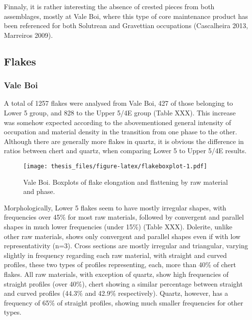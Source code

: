 \documentclass[12pt,twoside]{reedthesis}
\begin{document}
Finnaly, it is rather interesting the absence of crested pieces from both assemblages, mostly at Vale Boi, where this type of core maintenance product has been referenced for both Solutrean and Gravettian occupations (Cascalheira 2013, Marreiros 2009).
\begin{table}

\caption{\label{tab:corepreptypeVB}Core maintenance products by raw material for Upper 5/4E.}
\centering
{}
\end{table}
\hypertarget{flakes}{%
\subsection{Flakes}\label{flakes}}

\hypertarget{vale-boi-5}{%
\subsubsection{Vale Boi}\label{vale-boi-5}}

A total of 1257 flakes were analysed from Vale Boi, 427 of those belonging to Lower 5 group, and 828 to the Upper 5/4E group (Table XXX). This increase was somehow expected according to the abovementioned general intensity of occupation and material density in the transition from one phase to the other. Although there are generally more flakes in quartz, it is obvious the difference in ratios between chert and quartz, when comparing Lower 5 to Upper 5/4E results.
\begin{figure}
\centering
\texttt{[image: thesis\_files/figure-latex/flakeboxplot-1.pdf]}
\caption{\label{fig:flakeboxplot}Vale Boi. Boxplots of flake elongation and flattening by raw material and phase.}
\end{figure}
Morphologically, Lower 5 flakes seem to have mostly irregular shapes, with frequencies over 45\% for most raw materials, followed by convergent and parallel shapes in much lower frequencies (under 15\%) (Table XXX). Dolerite, unlike other raw materials, shows only convergent and parallel shapes even if with low representativity (n=3). Cross sections are mostly irregular and triangular, varying slightly in frequency regarding each raw material, with straight and curved profiles, these two types of profiles representing, each, more than 40\% of chert flakes. All raw materials, with exception of quartz, show high frequencies of straight profiles (over 40\%), chert showing a similar percentage between straight and curved profiles (44.3\% and 42.9\% respectively). Quartz, however, has a frequency of 65\% of straight profiles, showing much smaller frequencies for other types.
\end{document}
